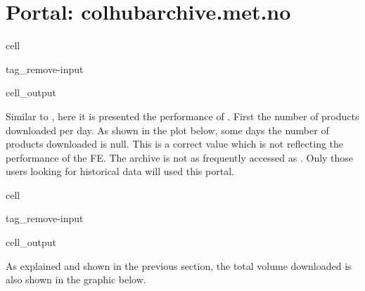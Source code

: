 \documentclass[letterpaper,10pt,english]{jupyterBook}
\begin{document}
\section{Portal: colhub\sphinxhyphen{}archive.met.no}
\label{\detokenize{user_downloads:portal-colhub-archive-met-no}}
\begin{sphinxuseclass}{cell}
\begin{sphinxuseclass}{tag_remove-input}\begin{sphinxVerbatimOutput}

\begin{sphinxuseclass}{cell_output}
\end{sphinxuseclass}\end{sphinxVerbatimOutput}

\end{sphinxuseclass}
\end{sphinxuseclass}
\sphinxAtStartPar
Similar to , here it is presented the performance of . First the number of products downloaded per day. As shown in the plot below, some days the number of products downloaded is null. This is a correct value which is not reflecting the performance of the FE. The archive is not as frequently accessed as . Only those users looking for historical data will used this portal.

\begin{sphinxuseclass}{cell}
\begin{sphinxuseclass}{tag_remove-input}\begin{sphinxVerbatimOutput}

\begin{sphinxuseclass}{cell_output}
\noindent{}

\end{sphinxuseclass}\end{sphinxVerbatimOutput}

\end{sphinxuseclass}
\end{sphinxuseclass}
\sphinxAtStartPar
As explained and shown in the previous section, the total volume downloaded is also shown in the graphic below.
\end{document}
